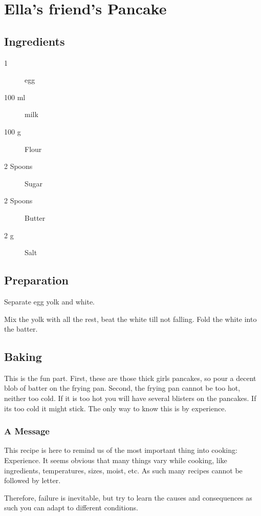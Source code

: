 \setchapterpreamble[u]{\margintoc}
\chapter{Ella's friend's Pancake}\label{pancake}

\section{Ingredients}

\begin{multicols}{2}
\begin{description}
	\item[1] egg
	\item[100 ml] milk
	\item[100 g] Flour
	\item[2 Spoons] Sugar
	\item[2 Spoons] Butter
	\item[2 g] Salt
\end{description}
\end{multicols}	

\section{Preparation}
Separate egg yolk and white.

Mix the yolk with all the rest, beat the white till not falling. Fold the white into the batter.

\section{Baking}

This is the fun part. First, these are those thick girls pancakes, so pour a decent blob of batter on the frying pan.
%
Second, the frying pan cannot be too hot, neither too cold. If it is too hot you will have several blisters on the pancakes. If its too cold it might stick. The only way to know this is by experience.

\subsection{A Message}

This recipe is here to remind us of the most important thing into cooking: Experience.
%
It seems obvious that many things vary while cooking, like ingredients, temperatures, sizes, moist, etc. As such many recipes cannot be followed by letter.

Therefore, failure is inevitable, but try to learn the causes and consequences as such you can adapt to different conditions. 
